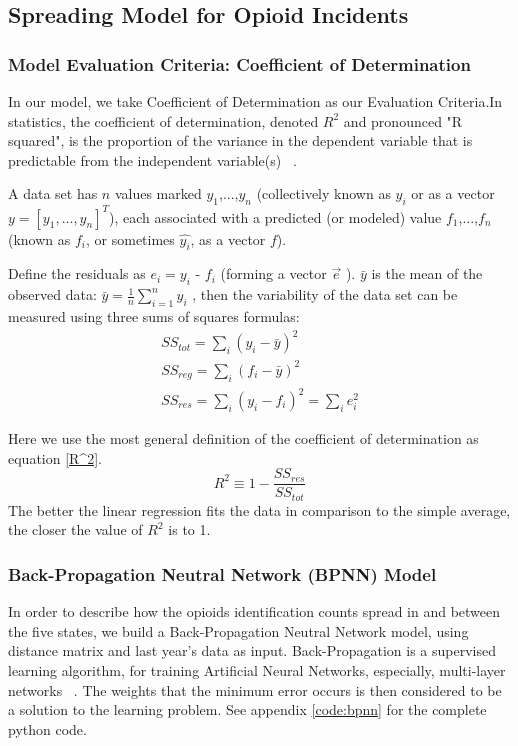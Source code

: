 \documentclass{mcmthesis}
\begin{document}
    
\subsection{ Spreading Model for Opioid Incidents }

    \subsubsection{Model Evaluation Criteria:  Coefficient of Determination}
    
    In our model, we take  Coefficient of Determination as our Evaluation Criteria.In statistics, the coefficient of determination, denoted $R^2$ and pronounced "R squared", is the proportion of the variance in the dependent variable that is predictable from the independent variable(s) ~\cite{R}. 
    
    A data set has $n$ values marked $y_1$,...,$y_n$ (collectively known as $y_i$ or as a vector $y = [y_1,...,y_n]^T$), each associated with a predicted (or modeled) value $f_1$,...,$f_n$ (known as $f_i$, or sometimes $\hat{y_i}$, as a vector $f$).

    Define the residuals as $e_i = y_i$ - $f_i$ (forming a vector $\vec{e}$ ). $\bar{y}$ is the mean of the observed data: 
    $\bar{y}=\frac{1}{n}\sum_{i=1}^n y_{i}$ , then the variability of the data set can be measured using three sums of squares formulas:
    \begin{gather}
        SS_{tot}=\sum _{i} \left ( y_i-\bar{y} \right )^2\\
         SS_{reg}=\sum _{i} \left ( f_i-\bar{y} \right )^2\\
       SS_{res}=\sum _{i} \left ( y_i-f_i \right )^2=\sum _{i}e_i^2
     \end{gather}
     
    Here we use the most general definition of the coefficient of determination as equation \ref{R^2}.
    \begin{equation}\label{R^2}
        R^2\equiv 1-\frac{SS_{res}}{SS_{tot}}
    \end{equation}
   The better the linear regression fits the data in comparison to the simple average, the closer the value of $R^{2}$ is to 1. 
    
	\subsubsection{Back-Propagation Neutral Network (BPNN) Model} \label{Sec:BPNN} 
	In order to describe how the opioids identification counts spread in and between the five states, we build a Back-Propagation Neutral Network model, using distance matrix and last year's data as input. Back-Propagation is a supervised learning algorithm, for training Artificial Neural Networks, especially,  multi-layer networks ~\cite{AI}. The weights that the minimum error occurs is then considered to be a solution to the learning problem. See appendix \ref{code:bpnn} for the complete python code. 
	
\end{document}
